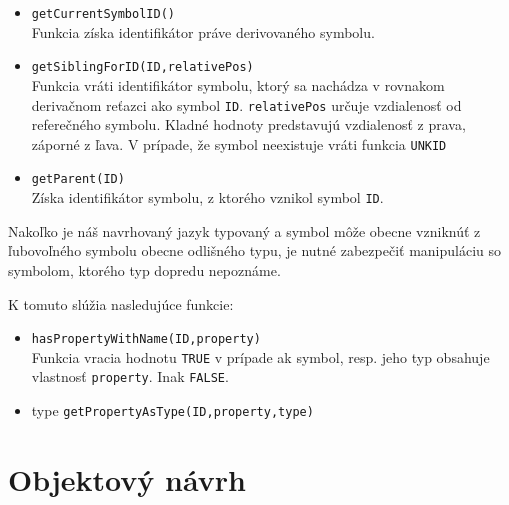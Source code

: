\begin{itemize}
\item \texttt{getCurrentSymbolID()} \\
	Funkcia získa identifikátor práve derivovaného symbolu.
\item \texttt{getSiblingForID(ID,relativePos)} \\
	Funkcia vráti identifikátor symbolu, ktorý sa nachádza v rovnakom derivačnom reťazci ako symbol \texttt{ID}. \texttt{relativePos} určuje vzdialenosť
	od referečného symbolu. Kladné hodnoty predstavujú vzdialenosť z prava, záporné z ľava. 
	V prípade, že symbol neexistuje vráti funkcia \texttt{UNKID}
\item \texttt{getParent(ID)} \\
	Získa identifikátor symbolu, z ktorého vznikol symbol \texttt{ID}.
\end{itemize}

Nakoľko je náš navrhovaný jazyk typovaný a symbol môže obecne vzniknúť z ľubovoľného symbolu obecne odlišného typu, je nutné zabezpečiť manipuláciu so
symbolom, ktorého typ dopredu nepoznáme.

K tomuto slúžia nasledujúce funkcie:
\begin{itemize}
\item \texttt{hasPropertyWithName(ID,property)} \\
	Funkcia vracia hodnotu \texttt{TRUE} v prípade ak symbol, resp. jeho typ obsahuje vlastnosť \texttt{property}. Inak \texttt{FALSE}.
\item type \texttt{getPropertyAsType(ID,property,type)}

\end{itemize}


\section{Objektový návrh}


